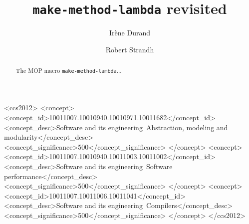 \documentclass[format=sigconf]{acmart}
\begin{document}

\title{\texttt{make-method-lambda} revisited}

\author{Irène Durand}

\author{Robert Strandh}






\begin{abstract}
The MOP macro \texttt{make-method-lambda}...
\end{abstract}

 \begin{CCSXML}
<ccs2012>
<concept>
<concept_id>10011007.10010940.10010971.10011682</concept_id>
<concept_desc>Software and its engineering~Abstraction, modeling and modularity</concept_desc>
<concept_significance>500</concept_significance>
</concept>
<concept>
<concept_id>10011007.10010940.10011003.10011002</concept_id>
<concept_desc>Software and its engineering~Software performance</concept_desc>
<concept_significance>500</concept_significance>
</concept>
<concept>
<concept_id>10011007.10011006.10011041</concept_id>
<concept_desc>Software and its engineering~Compilers</concept_desc>
<concept_significance>500</concept_significance>
</concept>
</ccs2012>
\end{CCSXML}
\end{document}
